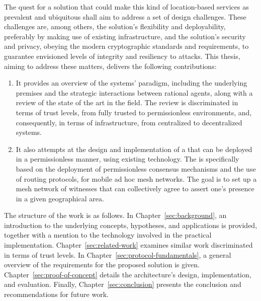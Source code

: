 The quest for a solution that could make this kind of location-based services as prevalent and ubiquitous shall aim to address a set of design challenges. These challenges are, among others, the solution's flexibility and deployability, preferably by making use of existing infrastructure, and the solution's security and privacy, obeying the modern cryptographic standards and requirements, to guarantee envisioned levels of integrity and resiliency to attacks. This thesis, aiming to address these matters, delivers the following contributions:
\begin{enumerate}
\item It provides an overview of the \pol{} systems' paradigm, including the underlying premises and the strategic interactions between rational agents, along with a review of the state of the art in the field. The review is discriminated in terms of trust levels, from fully trusted to permissionless environments, and, consequently, in terms of infrastructure, from centralized to decentralized systems.
\item It also attempts at the design and implementation of a \poc{} that can be deployed in a permissionless manner, using existing technology. The \poc{} is specifically based on the deployment of permissionless consensus mechanisms and the use of routing protocols, for mobile ad hoc mesh networks. The goal is to set up a mesh network of witnesses that can collectively agree to assert one's presence in a given geographical area.
\end{enumerate}

The structure of the work is as follows. In Chapter~\ref{sec:background}, an introduction to the underlying concepts, hypotheses, and applications is provided, together with a mention to the technology involved in the practical implementation. Chapter~\ref{sec:related-work} examines similar work discriminated in terms of trust levels. In Chapter~\ref{sec:protocol-fundamentals}, a general overview of the requirements for the proposed solution is given. Chapter~\ref{sec:proof-of-concept} details the architecture's design, implementation, and evaluation. Finally, Chapter~\ref{sec:conclusion} presents the conclusion and recommendations for future work.
